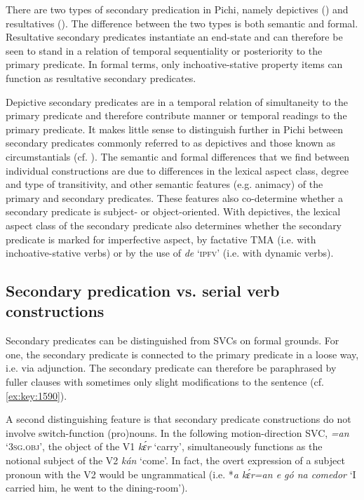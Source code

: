 There are two types of secondary predication in Pichi, namely depictives () and resultatives (). The difference between the two types is both semantic and formal. Resultative secondary predicates instantiate an end-state and can therefore be seen to stand in a relation of temporal sequentiality or posteriority to the primary predicate. In formal terms, only inchoative-stative property items can function as resultative secondary predicates.



Depictive secondary predicates are in a temporal relation of simultaneity to the primary predicate and therefore contribute manner or temporal readings to the primary predicate. It makes little sense to distinguish further in Pichi between secondary predicates commonly referred to as depictives and those known as circumstantials (cf. \citealt{HimmelmannBerndt2006}). The semantic and formal differences that we find between individual constructions are due to differences in the lexical aspect class, degree and type of transitivity, and other semantic features (e.g. animacy) of the primary and secondary predicates. These features also co-determine whether a secondary predicate is subject- or object-oriented. With depictives, the lexical aspect class of the secondary predicate also determines whether the secondary predicate is marked for imperfective aspect, by factative TMA (i.e. with inchoative-stative verbs) or by the use of \textit{de} ‘\textsc{ipfv}’ (i.e. with dynamic verbs).


\subsection{Secondary predication vs. serial verb constructions}

Secondary predicates can be distinguished from SVCs on formal grounds. For one, the secondary predicate is connected to the primary predicate in a loose way, i.e. via adjunction. The secondary predicate can therefore be paraphrased by fuller clauses with sometimes only slight modifications to the sentence (cf. \ref{ex:key:1590}).


A second distinguishing feature is that secondary predicate constructions do not involve switch-function (pro)nouns{\fff}. In the following motion-direction SVC, \textit{=an} ‘\textsc{3sg.obj}’, the object of the V1 \textit{kɛ́r} ‘carry’, simultaneously functions as the notional subject of the V2 \textit{kán} ‘come’. In fact, the overt expression of a subject{\fff} pronoun with the V2 would be ungrammatical (i.e. *\textit{a kɛ́r=an e gó na comedor} ‘I carried him, he went to the dining-room’). 



